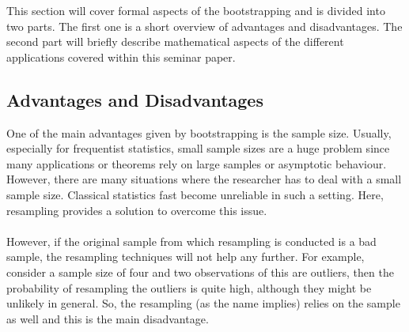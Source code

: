 This section will cover formal aspects of the bootstrapping and is divided into two parts. The first one is a short overview of advantages and disadvantages. The second part will briefly describe mathematical aspects of the different applications covered within this seminar paper. 

\subsection{Advantages and Disadvantages}
One of the main advantages given by bootstrapping is the sample size. Usually, especially for frequentist statistics, small sample sizes are a huge problem since many applications or theorems rely on large samples or asymptotic behaviour. However, there are many situations where the researcher has to deal with a small sample size. Classical statistics fast become unreliable in such a setting. Here, resampling provides a solution to overcome this issue. \\
\\
\noindent However, if the original sample from which resampling is conducted is a bad sample, the resampling techniques will not help any further. For example, consider a sample size of four and two observations of this are outliers, then the probability of resampling the outliers is quite high, although they might be unlikely in general. So, the resampling (as the name implies) relies on the sample as well and this is the main disadvantage. 

